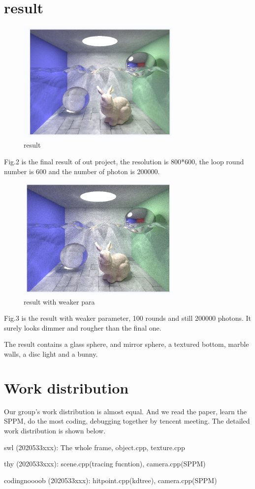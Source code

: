 \documentclass[acmtog]{acmart}
\begin{document}
\section{result}
\begin{figure}[h]
	\includegraphics[width=8cm,height=6cm]{result.png}
	\caption{result}
\end{figure}
Fig.2 is the final result of out project, the resolution is 800*600, the loop round number is 600 and the number of photon is 200000.
\begin{figure}[h]
	\includegraphics[width=8cm,height=6cm]{result100.png}
	\caption{result with weaker para}
\end{figure}

Fig.3 is the result with weaker parameter, 100 rounds and still 200000 photons. It surely looks dimmer and rougher than the final one.

The result contains a glass sphere, and mirror sphere, a textured bottom, marble walls, a disc light and a bunny.


\section{Work distribution} 

Our group's work distribution is almost equal. And we read the paper, learn the SPPM, do the most coding, debugging together by tencent meeting.
The detailed work distribution is shown below.

swl (2020533xxx): The whole frame, object.cpp, texture.cpp

thy (2020533xxx): scene.cpp(tracing fucntion), camera.cpp(SPPM)

codingnoooob (2020533xxx): hitpoint.cpp(kdtree), camera.cpp(SPPM)
\end{document}
